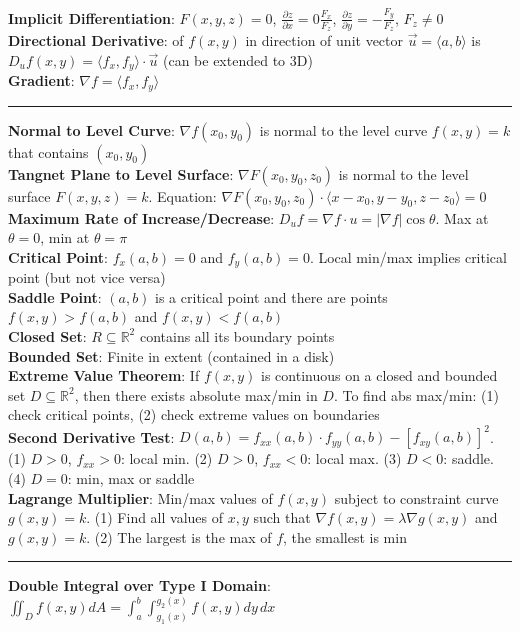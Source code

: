 \documentclass{article}
\begin{document}
{\begin{multicols*}{3}
\textbf{Implicit Differentiation}: $F(x,y,z)=0$, $\frac{\partial z}{\partial x}=0\frac{F_x}{F_z}$, $\frac{\partial z}{\partial y}=-\frac{F_y}{F_z}$, $F_z\not=0$ \\
\textbf{Directional Derivative}: of $f(x,y)$ in direction of unit vector $\vec{u}=\langle a,b\rangle$ is $D_uf(x,y)=\langle f_x,f_y\rangle\cdot \vec{u}$ (can be extended to 3D)\\
\textbf{Gradient}: $\nabla f=\langle f_x,f_y\rangle$ \\
\rule{193pt}{0.2pt}
\textbf{Normal to Level Curve}: $\nabla f(x_0,y_0)$ is normal to the level curve $f(x,y)=k$ that contains $(x_0,y_0)$ \\
\textbf{Tangnet Plane to Level Surface}: $\nabla F(x_0,y_0,z_0)$ is normal to the level surface $F(x,y,z)=k$. Equation: $\nabla F(x_0,y_0,z_0)\cdot \langle x-x_0,y-y_0,z-z_0\rangle=0$ \\
\textbf{Maximum Rate of Increase/Decrease}: $D_uf=\nabla f\cdot u=|\nabla f|\cos\theta$. Max at $\theta=0$, min at $\theta=\pi$ \\
\textbf{Critical Point}: $f_x(a,b)=0$ and $f_y(a,b)=0$. Local min/max implies critical point (but not vice versa) \\
\textbf{Saddle Point}: $(a,b)$ is a critical point and there are points $f(x,y)>f(a,b)$ and $f(x,y)<f(a,b)$ \\
\textbf{Closed Set}: $R\subseteq \mathbb{R}^2$ contains all its boundary points \\
\textbf{Bounded Set}: Finite in extent (contained in a disk) \\
\textbf{Extreme Value Theorem}: If $f(x,y)$ is continuous on a closed and bounded set $D\subseteq \mathbb{R}^2$, then there exists absolute max/min in $D$. To find abs max/min: (1) check critical points, (2) check extreme values on boundaries \\
\textbf{Second Derivative Test}: $D(a,b)=f_{xx}(a,b)\cdot f_{yy}(a,b)-[f_{xy}(a,b)]^2$. (1) $D>0$, $f_{xx}>0$: local min. (2) $D>0$, $f_{xx}<0$: local max. (3) $D<0$: saddle. (4) $D=0$: min, max or saddle \\
\textbf{Lagrange Multiplier}: Min/max values of $f(x,y)$ subject to constraint curve $g(x,y)=k$. (1) Find all values of $x,y$ such that  $\nabla f(x,y)=\lambda \nabla g(x,y)$ and $g(x,y)=k$. (2) The largest is the max of $f$, the smallest is min \\
\rule{193pt}{0.2pt}
\textbf{Double Integral over Type I Domain}: $\iint_Df(x,y)dA=\int_a^b\int_{g_1(x)}^{g_2(x)}f(x,y)dy\,dx$ \\

\end{multicols*}}
\end{document}
